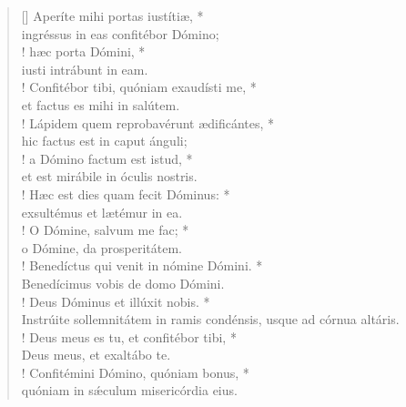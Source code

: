 \begin{verse}[\versewidth]
Aperíte mihi portas iustítiæ, *\\
ingréssus in eas confitébor Dómino;\\!
\vin hæc porta Dómini, *\\
\vin iusti intrábunt in eam.\\!
Confitébor tibi, quóniam exaudísti me, *\\
et factus es mihi in salútem.\\!
\vin Lápidem quem reprobavérunt ædificántes, *\\
\vin hic factus est in caput ánguli;\\!
a Dómino factum est istud, *\\
et est mirábile in óculis nostris.\\!
\vin Hæc est dies quam fecit Dóminus: *\\
\vin exsultémus et lætémur in ea.\\!
O Dómine, salvum me fac; *\\
o Dómine, da prosperitátem.\\!
\vin Benedíctus qui venit in nómine Dómini. *\\
\vin Benedícimus vobis de domo Dómini.\\!
Deus Dóminus et illúxit nobis. *\\
Instrúite sollemnitátem in ramis condénsis, usque ad córnua altáris.\\!
\vin Deus meus es tu, et confitébor tibi, *\\
\vin Deus meus, et exaltábo te.\\!
Confitémini Dómino, quóniam bonus, *\\
quóniam in s\'{æ}culum misericórdia eius.\\
\end{verse}
\vspace{1cm}

